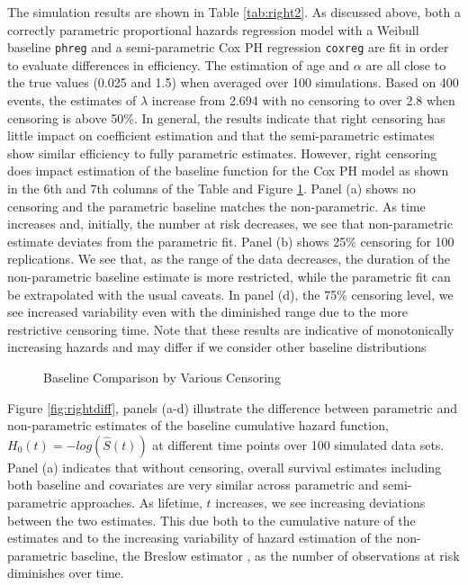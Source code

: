 \documentclass[12pt,letterpaper]{article}
\begin{document}
The simulation results are shown in Table \ref{tab:right2}. As discussed above, both a correctly parametric proportional hazards regression model with a Weibull baseline {\tt phreg} and a semi-parametric Cox PH regression {\tt coxreg} are fit in order to evaluate differences in efficiency. The estimation of age and $\alpha$ are all close to the true values (0.025 and 1.5) when averaged over 100 simulations.  Based on 400 events, the estimates of $\lambda$ increase from 2.694 with no censoring to over 2.8 when censoring is above 50\%. In general, the results indicate that right censoring has little impact on coefficient estimation and that the semi-parametric estimates show similar efficiency to fully parametric estimates. However, right censoring does impact estimation of the  baseline function for the Cox PH model as shown in the 6th and 7th columns of the Table and Figure \ref{fig:rightbase}.  Panel (a) shows no censoring and the parametric baseline matches the non-parametric. As time increases and, initially, the number at risk decreases, we see that non-parametric estimate deviates from the parametric fit. Panel (b) shows 25\% censoring for 100 replications. We see that, as the range of the data decreases, the duration of the non-parametric baseline estimate is more restricted, while the parametric fit can be extrapolated with the usual caveats.  In panel (d), the 75\% censoring level, we see increased variability even with the diminished range due to the more restrictive censoring time.  Note that these results are indicative of monotonically increasing hazards and may differ if we consider other baseline distributions

\begin{figure}[h!]
	\centering
	\quad
	\quad
	\quad
	\caption{Baseline Comparison by Various Censoring}
	\label{fig:rightbase}
\end{figure}



Figure \ref{fig:rightdiff}, panels (a-d) illustrate the difference between parametric and non-parametric estimates of the baseline cumulative hazard function, $H_0(t) = -log(\hat{S}(t))$ at different time points over 100 simulated data sets.  Panel (a) indicates that without censoring, overall survival estimates including both baseline and covariates are very similar across parametric and semi-parametric approaches.  As lifetime, $t$ increases, we see increasing deviations between the two estimates. This due both to the cumulative nature of the estimates and to the increasing variability of hazard estimation of the non-parametric baseline, the Breslow estimator \citep{DavHink1997,Burr1994}, as the number of observations at risk diminishes over time.
\end{document}
